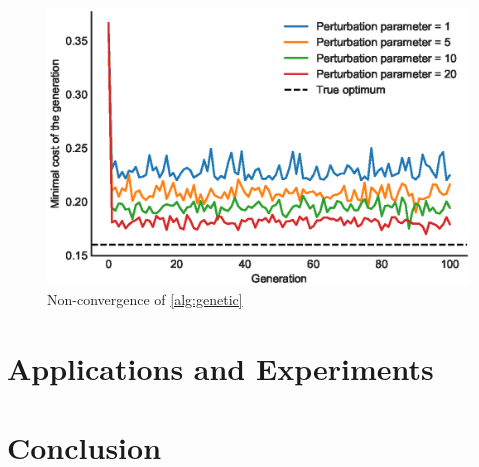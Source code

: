\documentclass{article}
\theoremstyle{definition}
\theoremstyle{remark}
\begin{document}
\begin{figure}[tb]
  \centering
  \includegraphics{figs/genetic.eps}
  \caption{Non-convergence of \cref{alg:genetic}}
  \label{fig:genetic_fail}
\end{figure}




\section{Applications and Experiments} %
\label{sec:applications_}




\section{Conclusion} %
\label{sec:conclusion}






\end{document}

